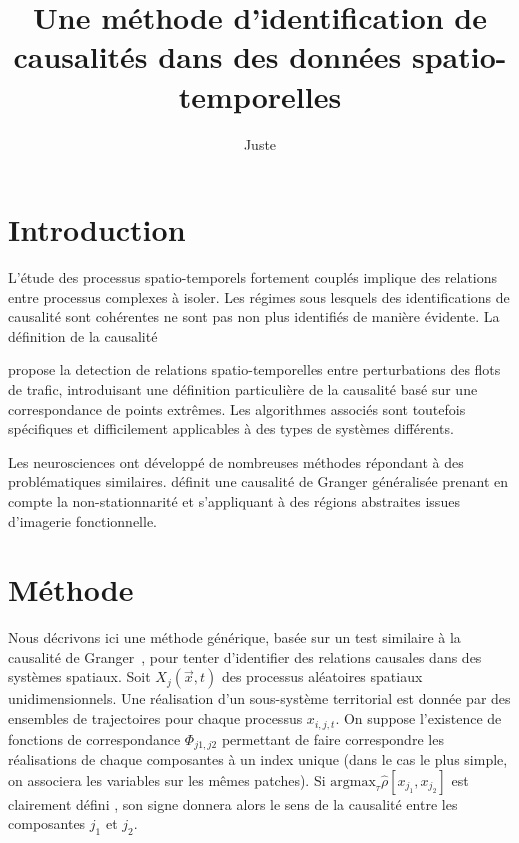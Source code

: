 \documentclass[french]{./sageo}
\title[Causalités Spatio-temporelles]{Une méthode d'identification de causalités dans des données spatio-temporelles}
\author[1,2]{Juste}{Raimbault}
\begin{document}
\maketitle

\newpage



\section{Introduction}



L'étude des processus spatio-temporels fortement couplés implique des relations entre processus complexes à isoler. Les régimes sous lesquels des identifications de causalité sont cohérentes ne sont pas non plus identifiés de manière évidente. La définition de la causalité


\cite{liu2011discovering} propose la detection de relations spatio-temporelles entre perturbations des flots de trafic, introduisant une définition particulière de la causalité basé sur une correspondance de points extrêmes. Les algorithmes associés sont toutefois spécifiques et difficilement applicables à des types de systèmes différents.

Les neurosciences ont développé de nombreuses méthodes répondant à des problématiques similaires. \cite{luo2013spatio} définit une causalité de Granger généralisée prenant en compte la non-stationnarité et s'appliquant à des régions abstraites issues d'imagerie fonctionnelle.



\section{Méthode}


Nous décrivons ici une méthode générique, basée sur un test similaire à la causalité de Granger~\cite{}, pour tenter d'identifier des relations causales dans des systèmes spatiaux. Soit $X_j(\vec{x},t)$ des processus aléatoires spatiaux unidimensionnels. Une réalisation d'un sous-système territorial est donnée par des ensembles de trajectoires pour chaque processus $x_{i,j,t}$. On suppose l'existence de fonctions de correspondance $\Phi_{j1,j2}$ permettant de faire correspondre les réalisations de chaque composantes à un index unique (dans le cas le plus simple, on associera les variables sur les mêmes patches). Si $\textrm{argmax}_{\tau} \hat{\rho}\left[x_{j_1},x_{j_2}\right]$ est clairement défini %
, son signe donnera alors le sens de la causalité entre les composantes $j_1$ et $j_2$.
\end{document}
